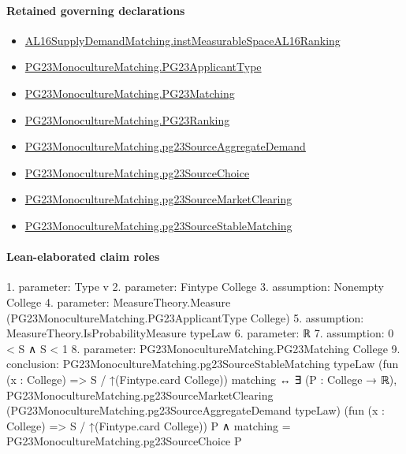 \documentclass[10pt]{article}
\begin{document}
\paragraph{Retained governing declarations}
\begin{itemize}\raggedright
\item \hyperlink{governing-declaration-45aa1aca7604d942}{AL16\allowbreak{}Supply\allowbreak{}Demand\allowbreak{}Matching.\allowbreak{}inst\allowbreak{}Measurable\allowbreak{}Space\allowbreak{}AL16\allowbreak{}Ranking}
\item \hyperlink{paper-prerequisite-40ad59c353cf95ec}{PG23\allowbreak{}Monoculture\allowbreak{}Matching.\allowbreak{}PG23\allowbreak{}Applicant\allowbreak{}Type}
\item \hyperlink{paper-prerequisite-6458c12e2da75e1b}{PG23\allowbreak{}Monoculture\allowbreak{}Matching.\allowbreak{}PG23\allowbreak{}Matching}
\item \hyperlink{paper-prerequisite-8769258a80216d15}{PG23\allowbreak{}Monoculture\allowbreak{}Matching.\allowbreak{}PG23\allowbreak{}Ranking}
\item \hyperlink{paper-prerequisite-3fb2e1ac28891e7d}{PG23\allowbreak{}Monoculture\allowbreak{}Matching.\allowbreak{}pg23\allowbreak{}Source\allowbreak{}Aggregate\allowbreak{}Demand}
\item \hyperlink{paper-prerequisite-1c7877b588e0c9b6}{PG23\allowbreak{}Monoculture\allowbreak{}Matching.\allowbreak{}pg23\allowbreak{}Source\allowbreak{}Choice}
\item \hyperlink{paper-prerequisite-55bbf5d44984bdf1}{PG23\allowbreak{}Monoculture\allowbreak{}Matching.\allowbreak{}pg23\allowbreak{}Source\allowbreak{}Market\allowbreak{}Clearing}
\item \hyperlink{paper-prerequisite-18523c5d09938568}{PG23\allowbreak{}Monoculture\allowbreak{}Matching.\allowbreak{}pg23\allowbreak{}Source\allowbreak{}Stable\allowbreak{}Matching}
\end{itemize}
\paragraph{Lean-elaborated claim roles}\begin{ReviewVerbatim}
1. parameter: Type v
2. parameter: Fintype College
3. assumption: Nonempty College
4. parameter: MeasureTheory.Measure (PG23MonocultureMatching.PG23ApplicantType College)
5. assumption: MeasureTheory.IsProbabilityMeasure typeLaw
6. parameter: ℝ
7. assumption: 0 < S ∧ S < 1
8. parameter: PG23MonocultureMatching.PG23Matching College
9. conclusion: PG23MonocultureMatching.pg23SourceStableMatching typeLaw (fun (x : College) => S / ↑(Fintype.card College)) matching ↔
  ∃ (P : College → ℝ),
    PG23MonocultureMatching.pg23SourceMarketClearing (PG23MonocultureMatching.pg23SourceAggregateDemand typeLaw)
        (fun (x : College) => S / ↑(Fintype.card College)) P ∧
      matching = PG23MonocultureMatching.pg23SourceChoice P
\end{ReviewVerbatim}
\end{document}
